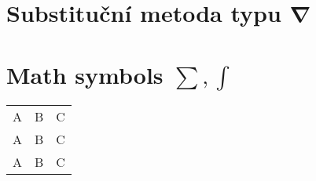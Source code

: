 \documentclass{article}
\begin{document}
  \shorthandoff{-}

  \tableofcontents
  \section[Substituční Metoda Typu \texorpdfstring{\(\nabla\)}{\textnabla}]
          {Substituční metoda typu \(\bm{\nabla}\)}

  \section[\texorpdfstring{Math symbols $\sum, \int$}%
                          {Math symbols \sum, \int}]%
          {Math symbols $\bm{\sum, \int}$}  %

  \begin{tabular}{ccc}
    A & B & C \\
    \cmidrule{2-3}
    A & B & C \\
    \cline{1-2}
    A & B & C \\
  \end{tabular}
\end{document}
